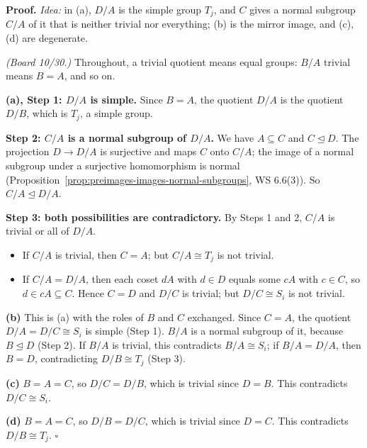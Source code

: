 \documentclass[11pt]{report}
\renewenvironment{proof}[1][Proof]{\noindent\textbf{#1.} }{\hfill$\square$\par\vspace{5pt}}
\begin{document}
\begin{proof}
\textit{Idea:} in (a), $D/A$ is the simple group $T_j$, and $C$ gives a normal subgroup $C/A$ of it that is neither trivial nor everything; (b) is the mirror image, and (c), (d) are degenerate.\par
\textit{(Board 10/30.)} Throughout, a trivial quotient means equal groups: $B/A$ trivial means $B = A$, and so on.

\textbf{(a), Step 1: $D/A$ is simple.} Since $B = A$, the quotient $D/A$ is the quotient $D/B$, which is $T_j$, a simple group.

\textbf{Step 2: $C/A$ is a normal subgroup of $D/A$.} We have $A \subseteq C$ and $C \trianglelefteq D$. The projection $D \to D/A$ is surjective and maps $C$ onto $C/A$; the image of a normal subgroup under a surjective homomorphism is normal (Proposition~\ref{prop:preimages-images-normal-subgroups}, WS 6.6(3)). So $C/A \trianglelefteq D/A$.

\textbf{Step 3: both possibilities are contradictory.} By Steps 1 and 2, $C/A$ is trivial or all of $D/A$.
\begin{itemize}[nosep]
    \item If $C/A$ is trivial, then $C = A$; but $C/A \cong T_j$ is not trivial.
    \item If $C/A = D/A$, then each coset $dA$ with $d \in D$ equals some $cA$ with $c \in C$, so $d \in cA \subseteq C$. Hence $C = D$ and $D/C$ is trivial; but $D/C \cong S_i$ is not trivial.
\end{itemize}

\textbf{(b)} This is (a) with the roles of $B$ and $C$ exchanged. Since $C = A$, the quotient $D/A = D/C \cong S_i$ is simple (Step 1). $B/A$ is a normal subgroup of it, because $B \trianglelefteq D$ (Step 2). If $B/A$ is trivial, this contradicts $B/A \cong S_i$; if $B/A = D/A$, then $B = D$, contradicting $D/B \cong T_j$ (Step 3).

\textbf{(c)} $B = A = C$, so $D/C = D/B$, which is trivial since $D = B$. This contradicts $D/C \cong S_i$.

\textbf{(d)} $B = A = C$, so $D/B = D/C$, which is trivial since $D = C$. This contradicts $D/B \cong T_j$.
\end{proof}
\end{document}
